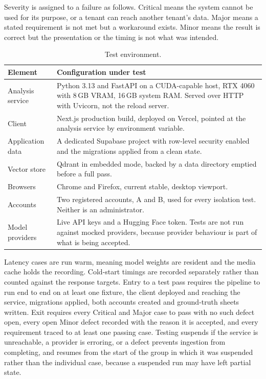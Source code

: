 \documentclass[11pt,a4paper]{article}
\begin{document}
Severity is assigned to a failure as follows. Critical means the system cannot be
used for its purpose, or a tenant can reach another tenant's data. Major means a
stated requirement is not met but a workaround exists. Minor means the result is
correct but the presentation or the timing is not what was intended.

\begin{table}[htbp]
\centering
\small
\begin{tabularx}{\textwidth}{@{}L{2.6cm}X@{}}
\toprule
\textbf{Element} & \textbf{Configuration under test} \\
\midrule
Analysis service & Python 3.13 and FastAPI on a CUDA-capable host, RTX 4060 with 8\,GB VRAM, 16\,GB system RAM. Served over HTTP with Uvicorn, not the reload server. \\
Client & Next.js production build, deployed on Vercel, pointed at the analysis service by environment variable. \\
Application data & A dedicated Supabase project with row-level security enabled and the migrations applied from a clean state. \\
Vector store & Qdrant in embedded mode, backed by a data directory emptied before a full pass. \\
Browsers & Chrome and Firefox, current stable, desktop viewport. \\
Accounts & Two registered accounts, A and B, used for every isolation test. Neither is an administrator. \\
Model providers & Live API keys and a Hugging Face token. Tests are not run against mocked providers, because provider behaviour is part of what is being accepted. \\
\bottomrule
\end{tabularx}
\caption{Test environment.}
\end{table}

Latency cases are run warm, meaning model weights are resident and the media
cache holds the recording. Cold-start timings are recorded separately rather than
counted against the response targets. Entry to a test pass requires the pipeline
to run end to end on at least one fixture, the client deployed and reaching the
service, migrations applied, both accounts created and ground-truth sheets
written. Exit requires every Critical and Major case to pass with no such defect
open, every open Minor defect recorded with the reason it is accepted, and every
requirement traced to at least one passing case. Testing suspends if the service
is unreachable, a provider is erroring, or a defect prevents ingestion from
completing, and resumes from the start of the group in which it was suspended
rather than the individual case, because a suspended run may have left partial
state.
\end{document}
